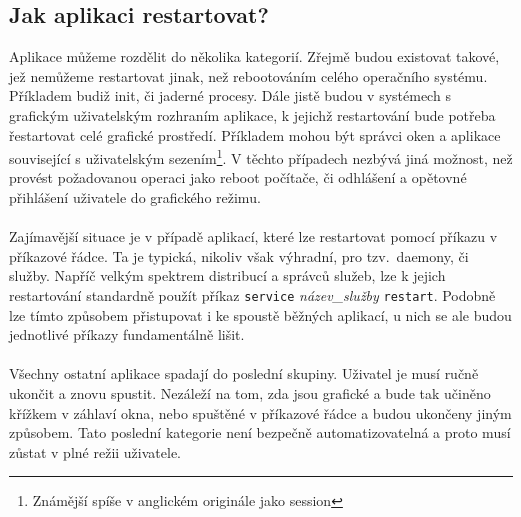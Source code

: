\documentclass[
  field=inf,
  biblatex,
  glossaries,
  index
]{kidiplom}
\begin{document}
	\subsection{Jak aplikaci restartovat?}
	Aplikace můžeme rozdělit do několika kategorií. Zřejmě budou existovat takové, jež nemůžeme restartovat jinak, než rebootováním celého operačního systému. Příkladem budiž init, či jaderné procesy. Dále jistě budou v systémech s grafickým uživatelským rozhraním aplikace, k jejichž restartování bude potřeba řestartovat celé grafické prostředí. Příkladem mohou být správci oken a aplikace související s uživatelským sezením\footnote{Známější spíše v anglickém originále jako session}. V těchto případech nezbývá jiná možnost, než provést požadovanou operaci jako reboot počítače, či odhlášení a opětovné přihlášení uživatele do grafického režimu.
	\\
	\\
	Zajímavější situace je v případě aplikací, které lze restartovat pomocí příkazu v příkazové řádce. Ta je typická, nikoliv však výhradní, pro tzv.\ daemony, či služby. Napříč velkým spektrem distribucí a správců služeb, lze k jejich restartování standardně použít příkaz \texttt{service} \textit{název\_služby} \texttt{restart}. Podobně lze tímto způsobem přistupovat i ke spoustě běžných aplikací, u nich se ale budou jednotlivé příkazy fundamentálně lišit.
	\\
	\\
	Všechny ostatní aplikace spadají do poslední skupiny. Uživatel je musí ručně ukončit a znovu spustit. Nezáleží na tom, zda jsou grafické a bude tak učiněno křížkem v záhlaví okna, nebo spuštěné v příkazové řádce a budou ukončeny jiným způsobem. Tato poslední kategorie není bezpečně automatizovatelná a proto musí zůstat v plné režii uživatele.
\end{document}
